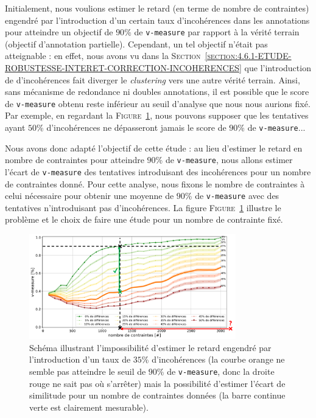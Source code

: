 		\begin{leftBarAuthorOpinion}
			
			Initialement, nous voulions estimer le retard (en terme de nombre de contraintes) engendré par l'introduction d'un certain taux d'incohérences dans les annotations pour atteindre un objectif de $90$\% de \texttt{v-measure} par rapport à la vérité terrain (objectif d'annotation partielle).
			Cependant, un tel objectif n'était pas atteignable : en effet, nous avons vu dans la \textsc{Section~\ref{section:4.6.1-ETUDE-ROBUSTESSE-INTERET-CORRECTION-INCOHERENCES}} que l'introduction de d'incohérences fait diverger le \textit{clustering} vers une autre vérité terrain.
			Ainsi, sans mécanisme de redondance ni doubles annotations, il est possible que le score de \texttt{v-measure} obtenu reste inférieur au seuil d'analyse que nous nous aurions fixé.
			Par exemple, en regardant la \textsc{Figure~\ref{figure:4.6.3-ETUDE-ROBUSTESSE-SIMULATION-IMPACT-DIFFERENCES}}, nous pouvons supposer que les tentatives ayant $50$\% d'incohérences ne dépasseront jamais le score de $90$\% de \texttt{v-measure}...
			
			Nous avons donc adapté l'objectif de cette étude : au lieu d'estimer le retard en nombre de contraintes pour atteindre $90$\% de \texttt{v-measure}, nous allons estimer l'écart de \texttt{v-measure} des tentatives introduisant des incohérences pour un nombre de contraintes donné.
			Pour cette analyse, nous fixons le nombre de contraintes à celui nécessaire pour obtenir une moyenne de $90$\% de \texttt{v-measure} avec des tentatives n'introduisant pas d'incohérences.
			La figure \textsc{Figure~\ref{figure:4.6.3-ETUDE-ROBUSTESSE-SIMULATION-IMPACT-DIFFERENCES}} illustre le problème et le choix de faire une étude pour un nombre de contrainte fixé.
			
			\begin{figure}[H]
				\centering
				\includegraphics[width=0.80\textwidth]{figures/etude-erreur-simulation-impact-schema}
				\caption{
					Schéma illustrant l'impossibilité d'estimer le retard engendré par l'introduction d'un taux de $35$\% d'incohérences (la courbe orange ne semble pas atteindre le seuil de $90$\% de \texttt{v-measure}, donc la droite rouge ne sait pas où s'arrêter) mais la possibilité d'estimer l'écart de similitude pour un nombre de contraintes données (la barre continue verte est clairement mesurable).
				}
				\label{figure:4.6.3-ETUDE-ROBUSTESSE-SIMULATION-IMPACT-DIFFERENCES}
			\end{figure}
		\end{leftBarAuthorOpinion}
	
